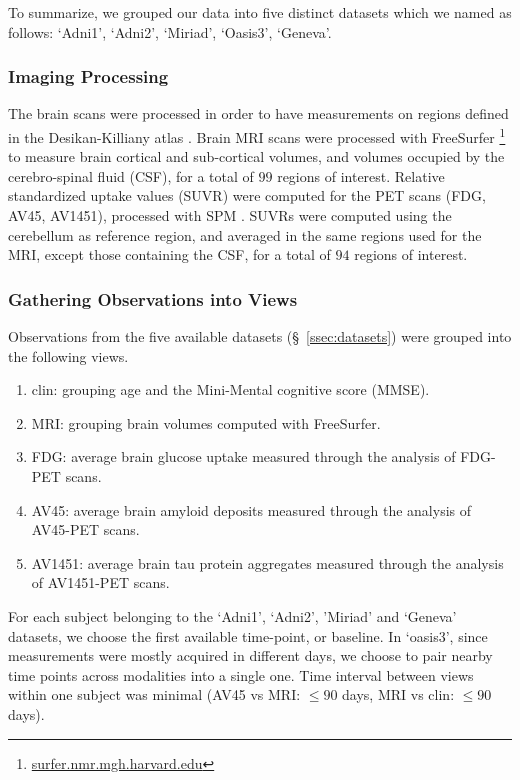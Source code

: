 To summarize, we grouped our data into five distinct datasets which we named as follows: `Adni1', `Adni2', `Miriad', `Oasis3', `Geneva'.

\subsubsection{Imaging Processing}
The brain scans were processed in order to have measurements on regions defined in the Desikan-Killiany atlas \citep{Desikan2006}.
Brain MRI scans were processed with FreeSurfer \footnote{\href{https://surfer.nmr.mgh.harvard.edu/}{surfer.nmr.mgh.harvard.edu}} \citep{freesurfer} to measure brain cortical and sub-cortical volumes, and volumes occupied by the cerebro-spinal fluid (CSF), for a total of $99$ regions of interest.
Relative standardized uptake values (SUVR) were computed for the PET scans (FDG, AV45, AV1451), processed with SPM \citep{Ashburner2000}.
SUVRs were computed using the cerebellum as reference region, and averaged in the same regions used for the MRI, except those containing the CSF, for a total of $94$ regions of interest.

\subsubsection{Gathering Observations into Views}
\label{ssec:views}


Observations from the five available datasets (\S~\ref{ssec:datasets}) were grouped into the following views.
\begin{enumerate}
\item clin: grouping age and the Mini-Mental cognitive score (MMSE).
\item MRI: grouping brain volumes computed with FreeSurfer.
\item FDG: average brain glucose uptake measured through the analysis of FDG-PET scans.
\item AV45: average brain amyloid deposits measured through the analysis of AV45-PET scans.
\item AV1451: average brain tau protein aggregates measured through the analysis of AV1451-PET scans.
\end{enumerate}

For each subject belonging to the `Adni1', `Adni2', 'Miriad' and `Geneva' datasets, we choose the first available time-point, or baseline.
In `oasis3', since measurements were mostly acquired in different days, we choose to pair nearby time points across modalities into a single one.
Time interval between views within one subject was minimal (AV45 vs MRI: $\leq 90$ days, MRI vs clin: $\leq 90$ days).

